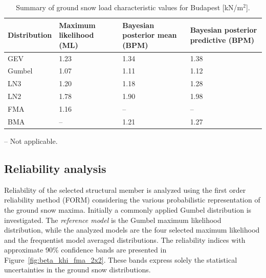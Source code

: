 \begin{table}[htbp!]
\caption{Summary of ground snow load characteristic values for Budapest [kN/m$^2$].}
\centering
\label{tab:char_snow_bp}
\small
	\begin{threeparttable}
    \begin{tabular}{l p{3cm} p{3cm} p{3cm}}
    \toprule
    Distribution  & Maximum likelihood (ML) & Bayesian posterior mean (BPM) & Bayesian posterior predictive (BPM) \\
    \midrule
    \rowcolor{lightgrey} GEV  & 1.23 & 1.34 & 1.38  \\
    Gumbel  & 1.07 & 1.11 & 1.12  \\
    \rowcolor{lightgrey} LN3  & 1.20 & 1.18 & 1.28  \\
    LN2  & 1.78 & 1.90 & 1.98  \\
    \rowcolor{lightgrey} FMA & 1.16 & -- & --  \\
   	BMA  & -- & 1.21 & 1.27 \\
    \bottomrule
    \end{tabular}
    \begin{tablenotes}
    	\item -- Not applicable.
    \end{tablenotes}
    \end{threeparttable}
\end{table}

\subsection{Reliability analysis}

Reliability of the selected structural member is analyzed using the first order reliability method (FORM) considering the various probabilistic representation of the ground snow maxima. Initially a commonly applied Gumbel distribution is investigated. The \textit{reference model} is the Gumbel maximum likelihood distribution, while the analyzed models are the four selected maximum likelihood and the frequentist model averaged distributions. The reliability indices with approximate 90\% confidence bands are presented in Figure~\ref{fig:beta_khi_fma_2x2}. These bands express solely the statistical uncertainties in the ground snow distributions.

